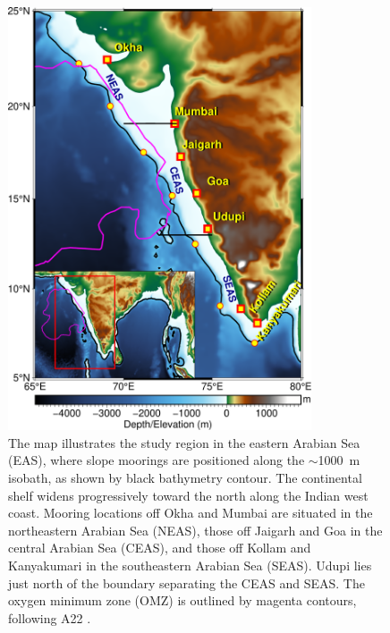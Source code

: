 \documentclass[authoryear,review,11pt]{elsarticle}
\begin{document}
\newpage
\begin{figure}[htbp]
	\centering
	\includegraphics[width=0.8\textwidth]{./fig_01_map.pdf} 
	\captionsetup{justification=justified,font=footnotesize,skip=0.05\baselineskip,width=0.8\textwidth}
	\caption{The map illustrates the study region in the eastern Arabian Sea (EAS), where slope moorings are positioned along the $\sim$1000~m isobath, as shown by black bathymetry contour. The continental shelf widens progressively toward the north along the Indian west coast. Mooring locations off Okha and Mumbai are situated in the northeastern Arabian Sea (NEAS), those off Jaigarh and Goa in the central Arabian Sea (CEAS), and those off Kollam and Kanyakumari in the southeastern Arabian Sea (SEAS). Udupi lies just north of the boundary separating the CEAS and SEAS. The oxygen minimum zone (OMZ) is outlined by magenta contours, following A22 \citep{naqvi1990seasonal, smith2005mesozooplankton}.}
	\label{fig:map}
\end{figure}
\end{document}
